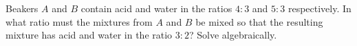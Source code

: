 Beakers $A$ and $B$ contain acid and water in the ratios $4:3$ and $5:3$ respectively. In what ratio must the mixtures from $A$ and $B$ be mixed so that the resulting mixture has acid and water in the ratio $3:2$? Solve algebraically.
